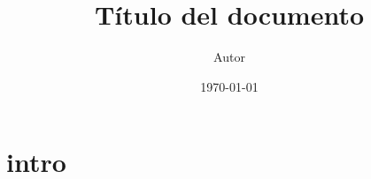 \documentclass[10pt,a4paper, twocolumn]{article}
\title{Título del documento}
\author{Autor}
\date{\today}
\begin{document}
\maketitle

\section{intro}
\end{document}
